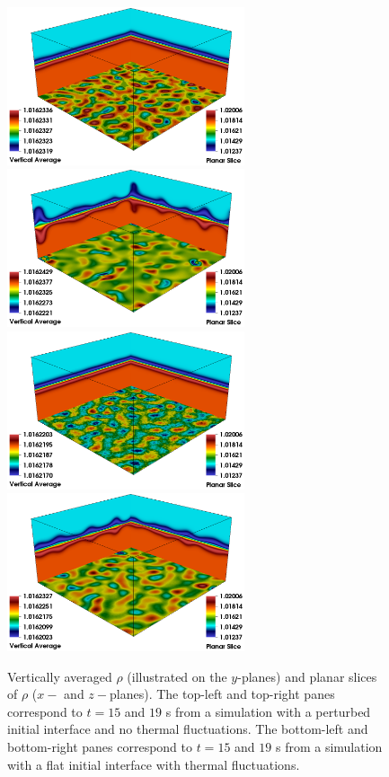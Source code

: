 \documentclass[final]{siamltex}
\begin{document}
\begin{figure}[hb]
\centering
\includegraphics[width=2.75in]{DLC_pert_t15}
\includegraphics[width=2.75in]{DLC_pert_t19}\\
\includegraphics[width=2.75in]{DLC_therm_t15}
\includegraphics[width=2.75in]{DLC_therm_t19}
\label{fig:dlc_images}
\caption{Vertically averaged $\rho$ (illustrated on the $y$-planes) and planar
slices of $\rho$ ($x-$ and $z-$planes).  The top-left and top-right panes correspond
to $t=15$ and $19$ s from a simulation with a perturbed initial interface and no thermal
fluctuations.  The bottom-left and bottom-right panes correspond to $t=15$ and $19$ s
from a simulation with a flat initial interface with thermal fluctuations.}
\end{figure}
\end{document}
